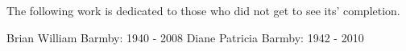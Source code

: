 \begin{center}
The following work is dedicated to those who did not get to see its' completion.\\

\vspace{10pt}

Brian William Barmby: 1940 - 2008 \hspace{1cm} Diane Patricia Barmby: 1942 - 2010

\end{center}